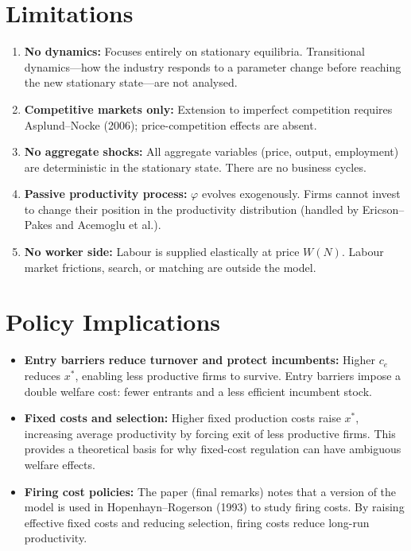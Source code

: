 \section{Limitations}

\begin{enumerate}
  \item \textbf{No dynamics:} Focuses entirely on stationary equilibria.
    Transitional dynamics---how the industry responds to a parameter change
    before reaching the new stationary state---are not analysed.
  \item \textbf{Competitive markets only:} Extension to imperfect competition
    requires Asplund--Nocke (2006); price-competition effects are absent.
  \item \textbf{No aggregate shocks:} All aggregate variables (price, output,
    employment) are deterministic in the stationary state. There are no
    business cycles.
  \item \textbf{Passive productivity process:} $\varphi$ evolves exogenously.
    Firms cannot invest to change their position in the productivity
    distribution (handled by Ericson--Pakes and Acemoglu et al.).
  \item \textbf{No worker side:} Labour is supplied elastically at price
    $W(N)$. Labour market frictions, search, or matching are outside the model.
\end{enumerate}

\section{Policy Implications}

\begin{itemize}
  \item \textbf{Entry barriers reduce turnover and protect incumbents:} Higher
    $c_e$ reduces $x^*$, enabling less productive firms to survive. Entry
    barriers impose a double welfare cost: fewer entrants and a less efficient
    incumbent stock.
  \item \textbf{Fixed costs and selection:} Higher fixed production costs
    raise $x^*$, increasing average productivity by forcing exit of less
    productive firms. This provides a theoretical basis for why fixed-cost
    regulation can have ambiguous welfare effects.
  \item \textbf{Firing cost policies:} The paper (final remarks) notes that
    a version of the model is used in Hopenhayn--Rogerson (1993) to study
    firing costs. By raising effective fixed costs and reducing selection,
    firing costs reduce long-run productivity.
\end{itemize}


